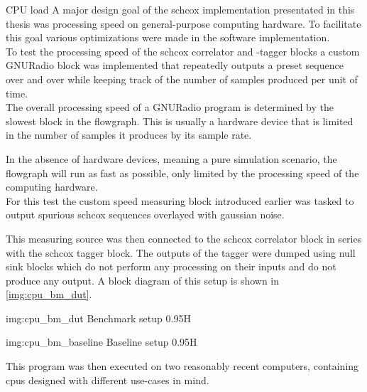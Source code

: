 \begin{subchapter}{CPU load}
  A major design goal of the \gls{schcox} implementation
  presentated in this thesis was processing speed on
  general-purpose computing hardware.
  To facilitate this goal various optimizations were
  made in the software implementation. \\

  To test the processing speed of the
  \gls{schcox} correlator and -tagger blocks
  a custom GNURadio block was implemented that repeatedly outputs
  a preset sequence over and over while keeping
  track of the number of samples produced per unit of time. \\

  The overall processing speed of a GNURadio program
  is determined by the slowest block in the flowgraph.
  This is usually a hardware device that is limited in
  the number of samples it produces by its sample rate.

  In the absence of hardware devices, meaning a pure
  simulation scenario, the flowgraph will run as fast
  as possible, only limited by the processing speed
  of the computing hardware. \\

  For this test the custom speed measuring block
  introduced earlier was tasked to output spurious
  \gls{schcox} sequences overlayed with gaussian noise.

  This measuring source was then connected to the
  \gls{schcox} correlator block in series with
  the \gls{schcox} tagger block.
  The outputs of the tagger were dumped using
  null sink blocks which do not perform any processing
  on their inputs and do not produce any output.
  A block diagram of this setup is shown in
  \autoref{img:cpu_bm_dut}.


  \vspace{0.5cm}
  \begin{minipage}{.5\textwidth}
                 {img:cpu_bm_dut}
                 {Benchmark setup}
                 {0.95}{H}
  \end{minipage}%
  \begin{minipage}{0.5\textwidth}
                 {img:cpu_bm_baseline}
                 {Baseline setup}
                 {0.95}{H}
  \end{minipage}
  \vspace{0.5cm}


  This program was then executed on two reasonably
  recent computers, containing \glspl{cpu} designed
  with different use-cases in mind.


\end{subchapter}
